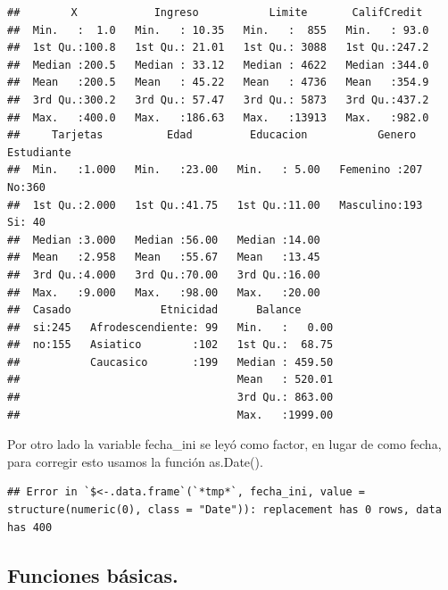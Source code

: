 \documentclass[
  12pt,
]{book}
\newenvironment{Shaded}{\begin{snugshade}}{\end{snugshade}}
\newcommand{\AttributeTok}[1]{\textcolor[rgb]{0.77,0.63,0.00}{#1}}
\newcommand{\FunctionTok}[1]{\textcolor[rgb]{0.00,0.00,0.00}{#1}}
\newcommand{\NormalTok}[1]{#1}
\newcommand{\OtherTok}[1]{\textcolor[rgb]{0.56,0.35,0.01}{#1}}
\newcommand{\SpecialCharTok}[1]{\textcolor[rgb]{0.00,0.00,0.00}{#1}}
\newcommand{\StringTok}[1]{\textcolor[rgb]{0.31,0.60,0.02}{#1}}
\begin{document}
\begin{verbatim}
##        X            Ingreso           Limite       CalifCredit   
##  Min.   :  1.0   Min.   : 10.35   Min.   :  855   Min.   : 93.0  
##  1st Qu.:100.8   1st Qu.: 21.01   1st Qu.: 3088   1st Qu.:247.2  
##  Median :200.5   Median : 33.12   Median : 4622   Median :344.0  
##  Mean   :200.5   Mean   : 45.22   Mean   : 4736   Mean   :354.9  
##  3rd Qu.:300.2   3rd Qu.: 57.47   3rd Qu.: 5873   3rd Qu.:437.2  
##  Max.   :400.0   Max.   :186.63   Max.   :13913   Max.   :982.0  
##     Tarjetas          Edad         Educacion           Genero    Estudiante
##  Min.   :1.000   Min.   :23.00   Min.   : 5.00   Femenino :207   No:360    
##  1st Qu.:2.000   1st Qu.:41.75   1st Qu.:11.00   Masculino:193   Si: 40    
##  Median :3.000   Median :56.00   Median :14.00                             
##  Mean   :2.958   Mean   :55.67   Mean   :13.45                             
##  3rd Qu.:4.000   3rd Qu.:70.00   3rd Qu.:16.00                             
##  Max.   :9.000   Max.   :98.00   Max.   :20.00                             
##  Casado              Etnicidad      Balance       
##  si:245   Afrodescendiente: 99   Min.   :   0.00  
##  no:155   Asiatico        :102   1st Qu.:  68.75  
##           Caucasico       :199   Median : 459.50  
##                                  Mean   : 520.01  
##                                  3rd Qu.: 863.00  
##                                  Max.   :1999.00
\end{verbatim}

Por otro lado la variable fecha\_ini se leyó como factor, en lugar de como fecha, para corregir esto usamos la función as.Date().

\begin{Shaded}
\end{Shaded}

\begin{verbatim}
## Error in `$<-.data.frame`(`*tmp*`, fecha_ini, value = structure(numeric(0), class = "Date")): replacement has 0 rows, data has 400
\end{verbatim}

\hypertarget{funciones-buxe1sicas.}{%
\subsection{\texorpdfstring{\textbf{Funciones básicas}.}{Funciones básicas.}}\label{funciones-buxe1sicas.}}
\end{document}
